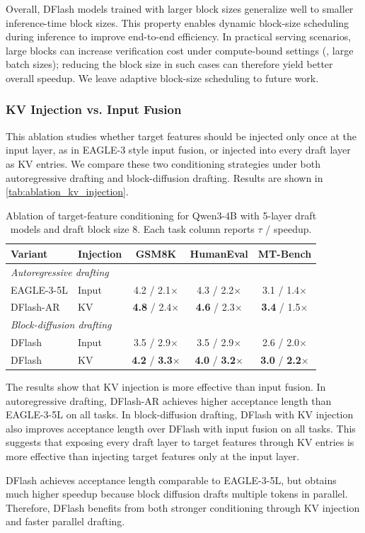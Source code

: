 Overall, DFlash models trained with larger block sizes generalize well to smaller inference-time block sizes. This property enables dynamic block-size scheduling during inference to improve end-to-end efficiency. In practical serving scenarios, large blocks can increase verification cost under compute-bound settings (\eg, large batch sizes); reducing the block size in such cases can therefore yield better overall speedup. We leave adaptive block-size scheduling to future work.

\subsubsection{KV Injection vs. Input Fusion}

This ablation studies whether target features should be injected only once at the input layer, as in EAGLE-3 style input fusion, or injected into every draft layer as KV entries. We compare these two conditioning strategies under both autoregressive drafting and block-diffusion drafting. Results are shown in \autoref{tab:ablation_kv_injection}.

\begin{table}[h]
\centering
\caption{
Ablation of target-feature conditioning for Qwen3-4B with 5-layer draft models and draft block size 8. 
Each task column reports $\tau$ / speedup.
}
\label{tab:ablation_kv_injection}
\small
\setlength{\tabcolsep}{3pt}
\begin{tabular*}{\columnwidth}{@{\extracolsep{\fill}}llccc@{}}
\toprule
Variant & Injection & GSM8K & HumanEval & MT-Bench \\
\midrule
\multicolumn{5}{l}{\textit{Autoregressive drafting}} \\
EAGLE-3-5L 
& Input 
& 4.2 / 2.1$\times$ 
& 4.3 / 2.2$\times$ 
& 3.1 / 1.4$\times$ \\
DFlash-AR 
& KV 
& \textbf{4.8} / 2.4$\times$ 
& \textbf{4.6} / 2.3$\times$ 
& \textbf{3.4} / 1.5$\times$ \\
\midrule
\multicolumn{5}{l}{\textit{Block-diffusion drafting}} \\
DFlash 
& Input 
& 3.5 / 2.9$\times$ 
& 3.5 / 2.9$\times$ 
& 2.6 / 2.0$\times$ \\
DFlash 
& KV 
& \textbf{4.2} / \textbf{3.3}$\times$ 
& \textbf{4.0} / \textbf{3.2}$\times$ 
& \textbf{3.0} / \textbf{2.2}$\times$ \\
\bottomrule
\end{tabular*}
\end{table}

The results show that KV injection is more effective than input fusion. In autoregressive drafting, DFlash-AR achieves higher acceptance length than EAGLE-3-5L on all tasks. In block-diffusion drafting, DFlash with KV injection also improves acceptance length over DFlash with input fusion on all tasks. This suggests that exposing every draft layer to target features through KV entries is more effective than injecting target features only at the input layer.

DFlash achieves acceptance length comparable to EAGLE-3-5L, but obtains much higher speedup because block diffusion drafts multiple tokens in parallel. Therefore, DFlash benefits from both stronger conditioning through KV injection and faster parallel drafting.
